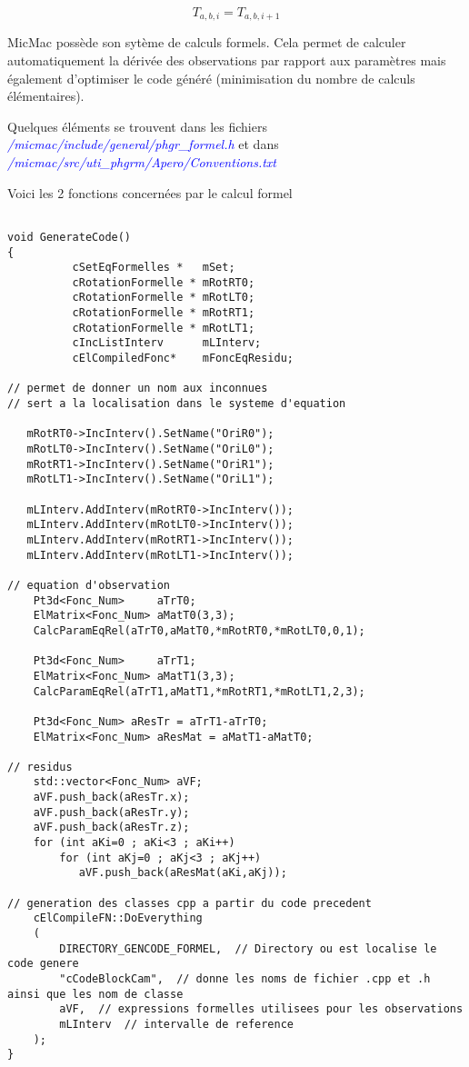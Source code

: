 \documentclass{article}
\newcommand\file[1]{
\textit{\textcolor{blue}{#1}}
}
\begin{document}
\begin{equation}
T_{a,b,i}=T_{a,b,i+1}
\end{equation}

MicMac possède son sytème de calculs formels.
Cela permet de calculer automatiquement la dérivée des observations par rapport aux paramètres mais également d'optimiser le code généré (minimisation du nombre de calculs élémentaires).

Quelques éléments se trouvent dans les fichiers \file{/micmac/include/general/phgr\_formel.h} et dans \file{/micmac/src/uti\_phgrm/Apero/Conventions.txt} 


Voici les 2 fonctions concernées par le calcul formel

\begin{verbatim}

void GenerateCode()
{
          cSetEqFormelles *   mSet;
          cRotationFormelle * mRotRT0;
          cRotationFormelle * mRotLT0;
          cRotationFormelle * mRotRT1;
          cRotationFormelle * mRotLT1;
          cIncListInterv      mLInterv;
          cElCompiledFonc*    mFoncEqResidu;

// permet de donner un nom aux inconnues 
// sert a la localisation dans le systeme d'equation 

   mRotRT0->IncInterv().SetName("OriR0");
   mRotLT0->IncInterv().SetName("OriL0");
   mRotRT1->IncInterv().SetName("OriR1");
   mRotLT1->IncInterv().SetName("OriL1");

   mLInterv.AddInterv(mRotRT0->IncInterv());
   mLInterv.AddInterv(mRotLT0->IncInterv());
   mLInterv.AddInterv(mRotRT1->IncInterv());
   mLInterv.AddInterv(mRotLT1->IncInterv());

// equation d'observation
    Pt3d<Fonc_Num>     aTrT0;
    ElMatrix<Fonc_Num> aMatT0(3,3);
    CalcParamEqRel(aTrT0,aMatT0,*mRotRT0,*mRotLT0,0,1);

    Pt3d<Fonc_Num>     aTrT1;
    ElMatrix<Fonc_Num> aMatT1(3,3);
    CalcParamEqRel(aTrT1,aMatT1,*mRotRT1,*mRotLT1,2,3);

    Pt3d<Fonc_Num> aResTr = aTrT1-aTrT0;
    ElMatrix<Fonc_Num> aResMat = aMatT1-aMatT0;

// residus
    std::vector<Fonc_Num> aVF;
    aVF.push_back(aResTr.x);
    aVF.push_back(aResTr.y);
    aVF.push_back(aResTr.z);
    for (int aKi=0 ; aKi<3 ; aKi++)
        for (int aKj=0 ; aKj<3 ; aKj++)
           aVF.push_back(aResMat(aKi,aKj));

// generation des classes cpp a partir du code precedent
    cElCompileFN::DoEverything
    (
        DIRECTORY_GENCODE_FORMEL,  // Directory ou est localise le code genere 
        "cCodeBlockCam",  // donne les noms de fichier .cpp et .h ainsi que les nom de classe
        aVF,  // expressions formelles utilisees pour les observations
        mLInterv  // intervalle de reference
    );
}



\end{verbatim}
\end{document}
